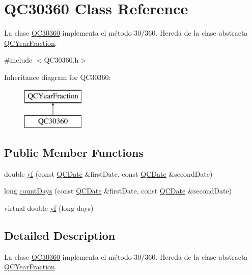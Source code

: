 \hypertarget{class_q_c30360}{\section{Q\+C30360 Class Reference}
\label{class_q_c30360}
}


La clase \hyperlink{class_q_c30360}{Q\+C30360} implementa el método 30/360. Hereda de la clase abstracta \hyperlink{class_q_c_year_fraction}{Q\+C\+Year\+Fraction}.  




{\ttfamily \#include $<$Q\+C30360.\+h$>$}

Inheritance diagram for Q\+C30360\+:\begin{figure}[H]
\begin{center}
\leavevmode
\includegraphics[height=2.000000cm]{class_q_c30360}
\end{center}
\end{figure}
\subsection*{Public Member Functions}
\begin{DoxyCompactItemize}
\item 
double \hyperlink{class_q_c30360_a4db09c9e51398c7b1bf99059d2d83094}{yf} (const \hyperlink{class_q_c_date}{Q\+C\+Date} \&first\+Date, const \hyperlink{class_q_c_date}{Q\+C\+Date} \&second\+Date)
\item 
long \hyperlink{class_q_c30360_a84ce06c39d386055dc91e43602e4d9e7}{count\+Days} (const \hyperlink{class_q_c_date}{Q\+C\+Date} \&first\+Date, const \hyperlink{class_q_c_date}{Q\+C\+Date} \&second\+Date)
\item 
virtual double \hyperlink{class_q_c30360_a9e7776fc765df31d5b60e8f7f87d4d55}{yf} (long days)
\end{DoxyCompactItemize}


\subsection{Detailed Description}
La clase \hyperlink{class_q_c30360}{Q\+C30360} implementa el método 30/360. Hereda de la clase abstracta \hyperlink{class_q_c_year_fraction}{Q\+C\+Year\+Fraction}. 

